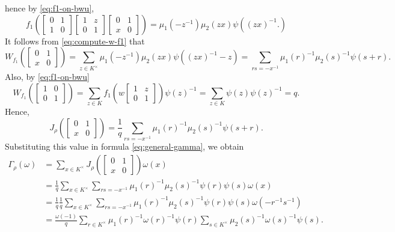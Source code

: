 \documentclass[../main.tex]{subfiles}
\begin{document}
hence by \eqref{eq:f1-on-bwu},
\[f_1\left(\begin{bmatrix}
	0 & 1 \\
	1 & 0
\end{bmatrix}\begin{bmatrix}
	1 & z \\
	0 & 1
\end{bmatrix}\begin{bmatrix}
	0 & 1 \\
	x & 0
\end{bmatrix}\right)=\mu_1\left(-z^{-1}\right)\mu_2(zx)\psi\left((zx)^{-1}.\right)\]
It follows from \eqref{eq:compute-w-f1} that
\[W_{f_1}\left(\begin{bmatrix}
	0 & 1 \\
	x & 0
\end{bmatrix}\right)=\sum_{z\in K^\times}\mu_1\left(-z^{-1}\right)\mu_2(zx)\psi\left((zx)^{-1}-z\right)=\sum_{rs=-x^{-1}}\mu_1(r)^{-1}\mu_2(s)^{-1}\psi(s+r).\]
Also, by \eqref{eq:f1-on-bwu}
\[W_{f_1}\left(\begin{bmatrix}
	1 & 0 \\
	0 & 1
\end{bmatrix}\right)=\sum_{z\in K}f_1\left(w\begin{bmatrix}
	1 & z \\
	0 & 1
\end{bmatrix}\right)\psi(z)^{-1}=\sum_{z\in K}\psi(z)\psi(z)^{-1}=q.\]
Hence,
\[J_\rho\left(\begin{bmatrix}
	0 & 1 \\
	x & 0
\end{bmatrix}\right)=\frac1q\sum_{rs=-x^{-1}}\mu_1(r)^{-1}\mu_2(s)^{-1}\psi(s+r).\]
Substituting this value in formula \eqref{eq:general-gamma}, we obtain
\begin{align*}
	\Gamma_\rho(\omega) &= \sum_{x\in K^\times}J_\rho\left(\begin{bmatrix}
		0 & 1 \\
		x & 0
	\end{bmatrix}\right)\omega(x) \\
	&= \frac1q\sum_{x\in K^\times}\sum_{rs=-x^{-1}}\mu_1(r)^{-1}\mu_2(s)^{-1}\psi(r)\psi(s)\omega(x) \\
	&= \frac1q\frac1q\sum_{x\in K^\times}\sum_{rs=-x^{-1}}\mu_1(r)^{-1}\mu_2(s)^{-1}\psi(r)\psi(s)\omega\left(-r^{-1}s^{-1}\right) \\
	&= \frac{\omega(-1)}q\sum_{r\in K^\times}\mu_1(r)^{-1}\omega(r)^{-1}\psi(r)\sum_{s\in K^\times}\mu_2(s)^{-1}\omega(s)^{-1}\psi(s).
\end{align*}
\end{document}
